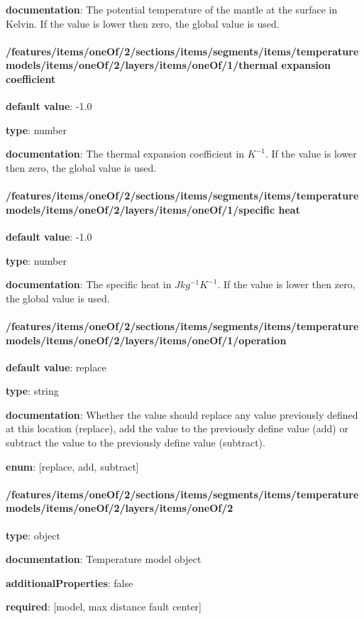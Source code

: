\begin{itemized}
\item {\bf documentation}: The potential temperature of the mantle at the surface in Kelvin. If the value is lower then zero, the global value is used.
\end{itemized}\paragraph{/features/items/oneOf/2/sections/items/segments/items/temperature models/items/oneOf/2/layers/items/oneOf/1/thermal expansion coefficient} \begin{itemized}
\item {\bf default value}: -1.0
\item {\bf type}: number
\item {\bf documentation}: The thermal expansion coefficient in $K^{-1}$. If the value is lower then zero, the global value is used.
\end{itemized}\paragraph{/features/items/oneOf/2/sections/items/segments/items/temperature models/items/oneOf/2/layers/items/oneOf/1/specific heat} \begin{itemized}
\item {\bf default value}: -1.0
\item {\bf type}: number
\item {\bf documentation}: The specific heat in $J kg^{-1} K^{-1}$. If the value is lower then zero, the global value is used.
\end{itemized}\paragraph{/features/items/oneOf/2/sections/items/segments/items/temperature models/items/oneOf/2/layers/items/oneOf/1/operation} \begin{itemized}
\item {\bf default value}: replace
\item {\bf type}: string
\item {\bf documentation}: Whether the value should replace any value previously defined at this location (replace), add the value to the previously define value (add) or subtract the value to the previously define value (subtract).
\item {\bf enum}: [replace, add, subtract]\end{itemized}\paragraph{/features/items/oneOf/2/sections/items/segments/items/temperature models/items/oneOf/2/layers/items/oneOf/2} \begin{itemized}
\item {\bf type}: object
\item {\bf documentation}: Temperature model object
\item {\bf additionalProperties}: false
\item {\bf required}: [model, max distance fault center]\end{itemized}

